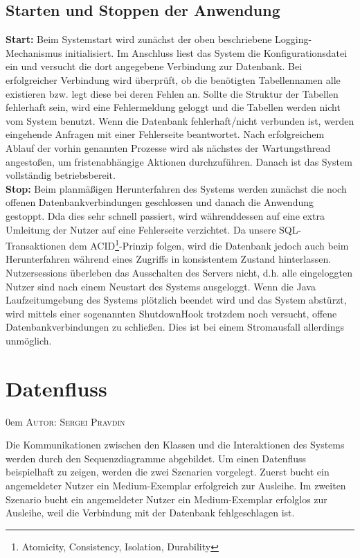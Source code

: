 \documentclass{article}
\makeatletter
\newcommand{\sectionauthor}[1]{
	{\parindent 0em \large \scshape Autor: #1 \par \nobreak \vspace*{1em}}
	\@afterheading
}
\makeatother
\begin{document}
\subsection{Starten und Stoppen der Anwendung}
\noindent \textbf{Start:} Beim Systemstart wird zunächst der oben beschriebene Logging-Mechanismus initialisiert. Im Anschluss liest das System die Konfigurationsdatei ein und versucht die dort angegebene Verbindung zur Datenbank. Bei erfolgreicher Verbindung wird überprüft, ob die benötigten Tabellennamen alle existieren bzw. legt diese bei deren Fehlen an. Sollte die Struktur der Tabellen fehlerhaft sein, wird eine Fehlermeldung geloggt und die Tabellen werden nicht vom System benutzt. Wenn die Datenbank fehlerhaft/nicht verbunden ist, werden eingehende Anfragen mit einer Fehlerseite beantwortet. Nach erfolgreichem Ablauf der vorhin genannten Prozesse wird als nächstes der Wartungsthread angestoßen, um fristenabhängige Aktionen durchzuführen. Danach ist das System vollständig betriebsbereit.\\
\textbf{Stop:}
Beim planmäßigen Herunterfahren des Systems werden zunächst die noch offenen Datenbankverbindungen geschlossen und danach die Anwendung gestoppt. Dda dies sehr schnell passiert, wird währenddessen auf eine extra Umleitung der Nutzer auf eine Fehlerseite verzichtet. Da unsere SQL-Transaktionen dem ACID\footnote{Atomicity, Consistency, Isolation, Durability}-Prinzip folgen, wird die Datenbank jedoch auch beim Herunterfahren während eines Zugriffs in konsistentem Zustand hinterlassen. Nutzersessions überleben das Ausschalten des Servers nicht, d.h. alle eingeloggten Nutzer sind nach einem Neustart des Systems ausgeloggt. Wenn die Java Laufzeitumgebung des Systems plötzlich beendet wird und das System abstürzt, wird mittels einer sogenannten ShutdownHook trotzdem noch versucht, offene Datenbankverbindungen zu schließen. Dies ist bei einem Stromausfall allerdings unmöglich.
\section{Datenfluss}
\sectionauthor{Sergei Pravdin}
Die Kommunikationen zwischen den Klassen und die Interaktionen des Systems werden durch den Sequenzdiagramme abgebildet. Um einen Datenfluss beispielhaft zu zeigen, werden die zwei Szenarien vorgelegt. Zuerst bucht ein angemeldeter Nutzer ein Medium-Exemplar erfolgreich zur Ausleihe. Im zweiten Szenario bucht ein angemeldeter Nutzer ein Medium-Exemplar erfolglos zur Ausleihe, weil die Verbindung mit der Datenbank fehlgeschlagen ist.
\end{document}
